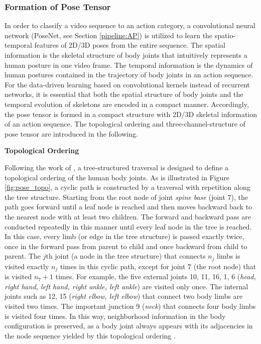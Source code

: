 \subsubsection{Formation of Pose Tensor}

In order to classify a video sequence to an action category, a convolutional neural network (PoseNet, see Section \ref{pipeline:AP}) is utilized to learn the spatio-temporal features of 2D/3D poses from the entire sequence. The spatial information is the skeletal structure of body joints that intuitively represents a human posture in one video frame. The temporal information is the dynamics of human postures contained in the trajectory of body joints in an action sequence. For the data-driven learning based on convolutional kernels instead of recurrent networks, it is essential that both the spatial structure of body joints and the temporal evolution of skeletons are encoded in a compact manner. Accordingly, the pose tensor is formed in a compact structure with 2D/3D skeletal information of an action sequence. The topological ordering and three-channel-structure of pose tensor are introduced in the following.

\textbf{Topological Ordering}

Following the work of \cite{DBLP:journals/corr/LiuSXW16}, a tree-structured traversal is designed to define a topological ordering of the human body joints. As is illustrated in Figure \ref{fig:pose_topo}, a cyclic path is constructed by a traversal with repetition along the tree structure. Starting from the root node of joint \textit{spine base} (joint 7), the path goes forward until a leaf node is reached and then moves backward back to the nearest node with at least two children. The forward and backward pass are conducted repeatedly in this manner until every leaf node in the tree is reached. In this case, every limb (or edge in the tree structure) is passed exactly twice, once in the forward pass from parent to child and once backward from child to parent. The $j$th joint (a node in the tree structure) that connects $n_{j}$ limbs is visited exactly $n_{j}$ times in this cyclic path, except for joint 7 (the root node) that is visited $n_{7} + 1$ times. For example, the five external joints 10, 11, 16, 1, 6 (\textit{head, right hand, left hand, right ankle, left ankle}) are visited only once. The internal joints such as 12, 15 (\textit{right elbow, left elbow}) that connect two body limbs are visited two times. The important junction 9 (\textit{neck}) that connects four body limbs is visited four times. In this way, neighborhood information in the body configuration is preserved, as a body joint always appears with its adjacencies in the node sequence yielded by this topological ordering \cite{lin2018}.

